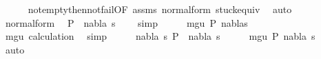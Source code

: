\begin{isabellebody}
\ \ \ \ \isamarkupfalse%
\ not{\isacharunderscore}{\kern0pt}empty{\isacharunderscore}{\kern0pt}then{\isacharunderscore}{\kern0pt}not{\isacharunderscore}{\kern0pt}fail{\isacharbrackleft}{\kern0pt}OF\ assms{\isacharparenleft}{\kern0pt}{}{\isacharparenright}{\kern0pt}{\isacharbrackright}{\kern0pt}\ normal{\isacharunderscore}{\kern0pt}form{\isacharparenleft}{\kern0pt}{}{\isacharparenright}{\kern0pt}\ stuck{\isacharunderscore}{\kern0pt}equiv\ \isamarkupfalse%
\ auto\isanewline
\ \ \isamarkupfalse%
\ normal{\isacharunderscore}{\kern0pt}form{\isacharparenleft}{\kern0pt}{}{\isacharparenright}{\kern0pt}\ \isamarkupfalse%
\ {\isachardoublequoteopen}P{}\ {\isasymTurnstile}\ {\isacharparenleft}{\kern0pt}nabla{\isacharprime}{\kern0pt}{\isacharcomma}{\kern0pt}\ s{\isacharprime}{\kern0pt}{\isacharparenright}{\kern0pt}\ {\isasymRightarrow}\ {\isacharparenleft}{\kern0pt}{\isacharbrackleft}{\kern0pt}{\isacharbrackright}{\kern0pt}{\isacharcomma}{\kern0pt}{\isacharbrackleft}{\kern0pt}{\isacharbrackright}{\kern0pt}{\isacharparenright}{\kern0pt}{\isachardoublequoteclose}\ \isamarkupfalse%
\ simp\isanewline
\ \ \isamarkupfalse%
\ \isamarkupfalse%
\ {\isachardoublequoteopen}mgu\ P{}\ {\isacharparenleft}{\kern0pt}nabla{\isacharprime}{\kern0pt}{\isacharcomma}{\kern0pt}s{\isacharprime}{\kern0pt}{\isacharparenright}{\kern0pt}{\isachardoublequoteclose}\ \isanewline
\ \ \ \ \isamarkupfalse%
\ mgu\ calculation\ \isamarkupfalse%
\ simp\isanewline
\ \ \isamarkupfalse%
\ \isamarkupfalse%
\ {\isachardoublequoteopen}{\isasymexists}nabla{\isacharprime}{\kern0pt}\ s{\isacharprime}{\kern0pt}{\isachardot}{\kern0pt}\ P{}\ {\isasymTurnstile}\ {\isacharparenleft}{\kern0pt}nabla{\isacharprime}{\kern0pt}{\isacharcomma}{\kern0pt}\ s{\isacharprime}{\kern0pt}{\isacharparenright}{\kern0pt}\ {\isasymRightarrow}\ {\isacharparenleft}{\kern0pt}{\isacharbrackleft}{\kern0pt}{\isacharbrackright}{\kern0pt}{\isacharcomma}{\kern0pt}\ {\isacharbrackleft}{\kern0pt}{\isacharbrackright}{\kern0pt}{\isacharparenright}{\kern0pt}\ \ {\isasymand}\ mgu\ P{}\ {\isacharparenleft}{\kern0pt}nabla{\isacharprime}{\kern0pt}{\isacharcomma}{\kern0pt}\ s{\isacharprime}{\kern0pt}{\isacharparenright}{\kern0pt}{\isachardoublequoteclose}\isanewline
\ \ \ \ \isamarkupfalse%
\ auto\isanewline
{}\isamarkupfalse%
%
\endisatagproof
{\isafoldproof}%
%
\isadelimproof
\isanewline
%
\endisadelimproof
\ \ \isanewline
%
\isadelimtheory
%
\endisadelimtheory
%
\isatagtheory
%
\endisatagtheory
{\isafoldtheory}%
%
\isadelimtheory
%
\endisadelimtheory
%
\end{isabellebody}%
